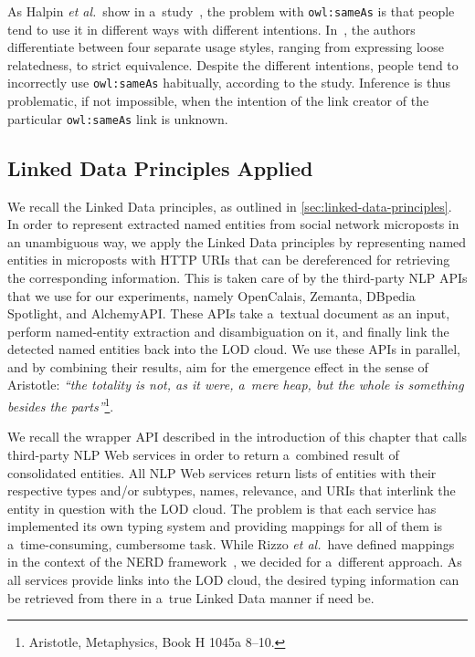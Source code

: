 \noindent As Halpin \emph{et al.}\ show
in a~study~\cite{halpin2010owlsameas}, the problem
with \texttt{owl:sameAs} is that people tend to use it
in different ways with different intentions.
In~\cite{halpin2010owlsameas},
the authors differentiate between four separate usage styles,
ranging from expressing loose relatedness,
to strict equivalence.
Despite the different intentions, people tend to incorrectly use
\texttt{owl:sameAs} habitually, according to the study.
Inference is thus problematic, if not impossible,
when the intention of the link creator of the particular
\texttt{owl:sameAs} link is unknown.

\subsection{Linked Data Principles Applied}

We recall the Linked Data principles, as outlined
in \autoref{sec:linked-data-principles}.
In order to represent extracted named entities from
social network microposts in an unambiguous way,
we apply the Linked Data principles
by representing named entities in microposts with HTTP URIs
that can be dereferenced for retrieving the corresponding information.
This is taken care of by the third-party NLP APIs
that we use for our experiments, namely OpenCalais,
Zemanta, DBpedia Spotlight, and AlchemyAPI.
These APIs take a~textual document as an input,
perform named-entity extraction and disambiguation on it,
and finally link the detected named entities back
into the LOD cloud.
We use these APIs in parallel, and by combining their results,
aim for the emergence effect in the sense of Aristotle:
\textit{``the totality is not, as it were, a~mere heap,
but the whole is something besides the
parts''}\footnote{Aristotle, Metaphysics, Book H 1045a 8--10.}.

We recall the wrapper API described in the introduction of
this chapter that calls third-party NLP Web services
in order to return a~combined result of consolidated entities.
All NLP Web services return lists of entities with
their respective types and/or subtypes, names,
relevance, and URIs that interlink the entity in question
with the LOD cloud.
The problem is that each service has implemented
its own typing system and providing mappings for all of them
is a~time-consuming, cumbersome task.
While Rizzo \emph{et al.}\ have defined mappings in the context
of the NERD framework~\cite{rizzo2011nerd,rizzo2012nerd},
we decided for a~different approach.
As all services provide links into the LOD cloud,
the desired typing information can be retrieved from there
in a~true Linked Data manner if need be.

